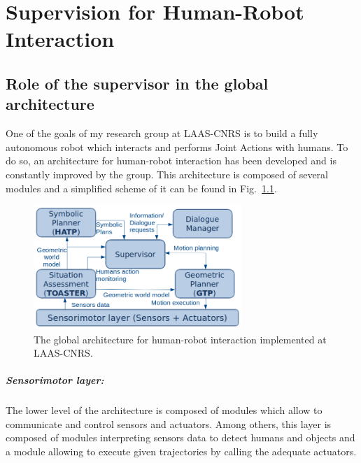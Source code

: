 \documentclass[english,a4paper,11pt,twoside]{StyleThese}
\begin{document}
\setcounter{chapter}{1} %
\dominitoc
\faketableofcontents
\fi

\chapter{Supervision for Human-Robot Interaction}
\minitoc

\label{ch:Sup}

\section{Role of the supervisor in the global architecture}

\label{sec:globalArchi}

One of the goals of my research group at LAAS-CNRS is to build a fully autonomous robot which interacts and performs Joint Actions with humans. To do so, an architecture for human-robot interaction has been developed and is constantly improved by the group. This architecture is composed of several modules and a simplified scheme of it can be found in Fig.~\ref{fig:GlobalArchi}.

\begin{figure}[!h]
	\centering
    \includegraphics[width=0.7\textwidth]{figs/Chapter2/archiGlobal.png}
    \caption{The global architecture for human-robot interaction implemented at LAAS-CNRS.}
    \label{fig:GlobalArchi}
\end{figure}

\paragraph{Sensorimotor layer:}
The lower level of the architecture is composed of modules which allow to communicate and control sensors and actuators. Among others, this layer is composed of modules interpreting sensors data to detect humans and objects and a module allowing to execute given trajectories by calling the adequate actuators.
\end{document}
